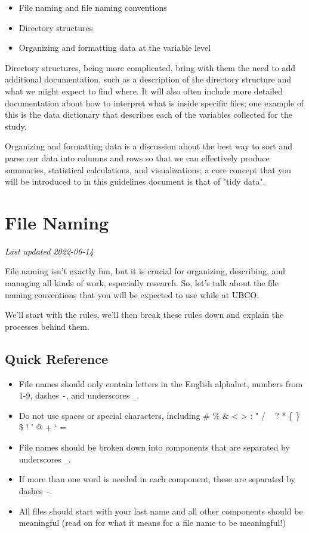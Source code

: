 \documentclass[
]{book}
\providecommand{\tightlist}{%
  \setlength{\itemsep}{0pt}\setlength{\parskip}{0pt}}
\begin{document}
\begin{itemize}
\tightlist
\item
  File naming and file naming conventions
\item
  Directory structures
\item
  Organizing and formatting data at the variable level
\end{itemize}

Directory structures, being more complicated, bring with them the need to add additional documentation, such as a description of the directory structure and what we might expect to find where. It will also often include more detailed documentation about how to interpret what is inside specific files; one example of this is the data dictionary that describes each of the variables collected for the study.

Organizing and formatting data is a discussion about the best way to sort and parse our data into columns and rows so that we can effectively produce summaries, statistical calculations, and visualizations; a core concept that you will be introduced to in this guidelines document is that of "tidy data".

\hypertarget{file-naming}{%
\chapter{File Naming}\label{file-naming}}

\emph{Last updated 2022-06-14}

File naming isn't exactly fun, but it is crucial for organizing, describing, and managing all kinds of work, especially research. So, let's talk about the file naming conventions that you will be expected to use while at UBCO.

We'll start with the rules, we'll then break these rules down and explain the processes behind them.

\hypertarget{quick-reference}{%
\section{Quick Reference}\label{quick-reference}}

\begin{itemize}
\tightlist
\item
  File names should only contain letters in the English alphabet, numbers from 1-9, dashes \texttt{-}, and underscores \texttt{\_}.
\item
  Do not use spaces or special characters, including \# \% \& \textless{} \textgreater{} : " / ~\textbar{} ? * \{ \} \$ ! ' @ + ` =
\item
  File names should be broken down into components that are separated by underscores \texttt{\_}.
\item
  If more than one word is needed in each component, these are separated by dashes \texttt{-}.
\item
  All files should start with your last name and all other components should be meaningful (read on for what it means for a file name to be meaningful!)
\end{itemize}
\end{document}
